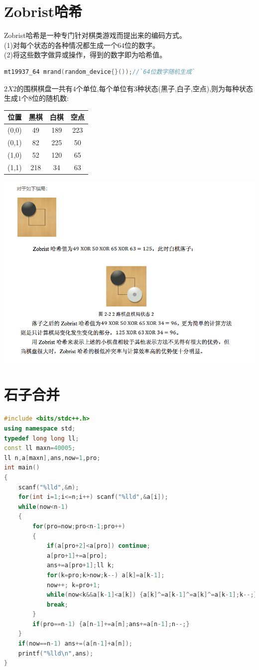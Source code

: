 \documentclass[a4paper]{book}
\begin{document}
\section{Zobrist哈希}
\indent Zobrist哈希是一种专门针对棋类游戏而提出来的编码方式。\\
\indent(1)对每个状态的各种情况都生成一个$64$位的数字。\\
\indent(2)将这些数字做异或操作，得到的数字即为哈希值。
\begin{lstlisting}[language=c++,escapeinside=``]
mt19937_64 mrand(random_device{}());//`64位数字随机生成`
\end{lstlisting}
$2X2$的围棋棋盘一共有$4$个单位,每个单位有$3$种状态(黑子,白子,空点),则为每种状态生成$1$个$8$位的随机数:
\begin{center}
    \begin{tabular}{|c|c|c|c|}
    \hline 
    位置 & 黑棋 & 白棋 & 空点\\
    \hline 
    (0,0) & 49 & 189 & 223\\
    \hline 
    (0,1) & 82 & 225 & 50 \\
    \hline 
    (1,0) & 52 & 120 & 65\\
    \hline
    (1,1) & 218 & 34 & 63 \\
    \hline
    \end{tabular}    
\end{center}
\includegraphics[width=1\textwidth,center]{../photo/zbh}
\section{石子合并}
\begin{lstlisting}[language=c++]
#include <bits/stdc++.h>
using namespace std;
typedef long long ll;
const ll maxn=40005;
ll n,a[maxn],ans,now=1,pro;
int main()
{
	scanf("%lld",&n);
	for(int i=1;i<=n;i++) scanf("%lld",&a[i]);
	while(now<n-1)
	{
		for(pro=now;pro<n-1;pro++)
		{
			if(a[pro+2]<a[pro]) continue;
			a[pro+1]+=a[pro];
            ans+=a[pro+1];ll k;
			for(k=pro;k>now;k--) a[k]=a[k-1]; 
            now++; k=pro+1;
			while(now<k&&a[k-1]<a[k]) {a[k]^=a[k-1]^=a[k]^=a[k-1];k--;}
			break;
		}
		if(pro==n-1) {a[n-1]+=a[n];ans+=a[n-1];n--;}
	}
	if(now==n-1) ans+=(a[n-1]+a[n]); 
    printf("%lld\n",ans);
}
\end{lstlisting}
\end{document}
